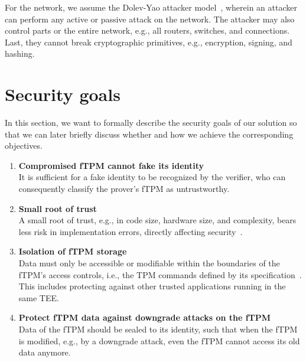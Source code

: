 For the network, we assume the Dolev-Yao attacker model~\cite{Dolev1983}, wherein an attacker can perform any active or passive attack on the network.
The attacker may also control parts or the entire network, e.g., all routers, switches, and connections.
Last, they cannot break cryptographic primitives, e.g., encryption, signing, and hashing.

\section{Security goals}

In this section, we want to formally describe the security goals of our solution so that we can later briefly discuss whether and how we achieve the corresponding objectives.

\begin{enumerate}[label=\textbf{SG-\arabic*}]
  \item{\textbf{Compromised fTPM cannot fake its identity}\\
  It is sufficient for a fake identity to be recognized by the verifier, who can consequently classify the prover's fTPM as untrustworthy.}\label{sg:1}

  \item{\textbf{Small root of trust}\\
  A small root of trust, e.g., in code size, hardware size, and complexity, bears less risk in implementation errors, directly affecting security~\cite{Singaravelu2006}.
  }\label{sg:2}
  
  \item{\textbf{Isolation of fTPM storage}\\
  Data must only be accessible or modifiable within the boundaries of the fTPM's access controls, i.e., the TPM commands defined by its specification~\cite{tpm20}.
  This includes protecting against other trusted applications running in the same \ac{TEE}\@.}\label{sg:3}
  
  \item{\textbf{Protect fTPM data against downgrade attacks on the fTPM}\\
  Data of the fTPM should be sealed to its identity, such that when the fTPM is modified, e.g., by a downgrade attack, even the fTPM cannot access its old data anymore.}\label{sg:4}

\end{enumerate}

